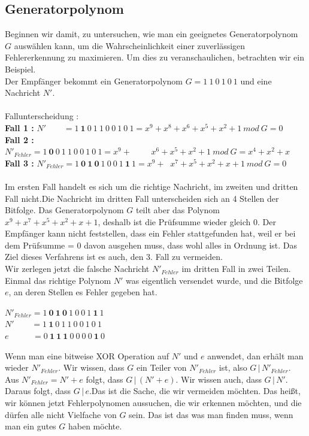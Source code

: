 \documentclass[course=erap]{aspdoc}
\begin{document}
\subsection{Generatorpolynom}
Beginnen wir damit, zu untersuchen, wie man ein geeignetes Generatorpolynom $G$ auswählen kann, um die Wahrscheinlichkeit einer zuverlässigen Fehlererkennung zu maximieren\cite{williams1993painless}. Um dies zu veranschaulichen, betrachten wir ein Beispiel.\\
Der Empfänger bekommt ein Generatorpolynom $G = 1\:1\:0\:1\:0\:1$ und eine Nachricht $N'$.\\
\\
Fallunterscheidung : \\
\textbf{Fall 1 :} $N' \quad\;\;\;\:= 1\:\textbf{1}\:0\:1\:1\:0\:0\:1\:0\:1 = x^9+x^8+x^6+x^5+x^2+1\:mod\:G = 0$\\
\textbf{Fall 2 :} $N'_{Fehler} = 1\:\textbf{0}\:0\:1\:1\:0\:0\:1\:0\:1 = x^9+\qquad \,\,x^6+x^5+x^2+1\:mod\:G = x^4+x^2+x$\\
\textbf{Fall 3 :} $N'_{Fehler} = 1\:\textbf{0}\:\textbf{1}\:\textbf{0}\:1\:0\:0\:1\:\textbf{1}\:1 = x^9+\;\;x^7+x^5+x^2+x+1\:mod\:G = 0$\\
\\
Im ersten Fall handelt es sich um die richtige Nachricht, im zweiten und dritten Fall nicht.Die Nachricht im dritten Fall unterscheiden sich an 4 Stellen der Bitfolge. Das Generatorpolynom $G$ teilt aber das Polynom $x^9+x^7+x^5+x^2+x+1$, deshalb ist die Prüfsumme wieder gleich 0. Der Empfänger kann nicht feststellen, dass ein Fehler stattgefunden hat, weil er bei dem Prüfsumme = 0 davon ausgehen muss, dass wohl alles in Ordnung ist. Das Ziel dieses Verfahrens ist es auch, den 3. Fall zu vermeiden. \\

Wir zerlegen jetzt die falsche Nachricht $N'_{Fehler}$ im dritten Fall in zwei Teilen. Einmal das richtige Polynom $N'$ was eigentlich versendet wurde, und die Bitfolge $e$, an deren Stellen es Fehler gegeben hat.
\begin{center}
$N'_{Fehler} = 1\:\textbf{0}\:\textbf{1}\:\textbf{0}\:1\:0\:0\:1\:\textbf{1}\:1$ \\
$N' \quad\;\;\;\:= 1\:\textbf{1}\:0\:1\:1\:0\:0\:1\:0\:1$ \\
$e \quad\;\;\;\;\;\;\,= 0\:\textbf{1}\:\textbf{1}\:\textbf{1}\:0\:0\:0\:0\:\textbf{1}\:0$\\
\end{center}
Wenn man eine bitweise XOR Operation auf $N'$ und $e$ anwendet, dan erhält man wieder $N'_{Fehler}$. Wir wissen, dass $G$ ein Teiler von $N'_{Fehler}$ ist, also $G\,|\,N'_{Fehler}$. Aus $N'_{Fehler} = N' + e$ folgt, dass $G\,|\,(N' + e)$. Wir wissen auch, dass $G\,|\,N'$. Daraus folgt, dass $G\,|\,e$.Das ist die Sache, die wir vermeiden möchten. Das heißt, wir können jetzt Fehlerpolynomen aussuchen, die wir erkennen möchten, und die dürfen alle nicht Vielfache von $G$ sein. Das ist das was man finden muss, wenn man ein gutes $G$ haben möchte. \\
\end{document}
